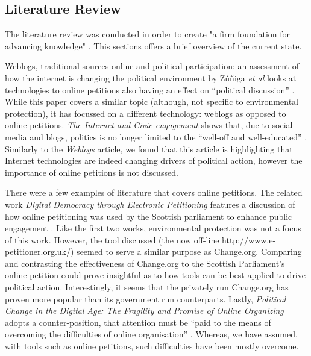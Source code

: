 
\subsection{Literature Review}
\label{subsec:literaturereview}
The literature review was conducted in order to create "a firm foundation for advancing knowledge" \citep[p. xiii]{webster2002analyzing}. This sections offers a brief overview of the current state.\par\vspace{0.2cm}

{Weblogs, traditional sources online and political participation: an assessment of how the internet is changing the political environment} by Zúñiga \textit{et al} looks at technologies to online petitions also having an effect on ``political discussion'' \citep{de2009weblogs}. While this paper covers a similar topic (although, not specific to environmental protection), it has focussed on a different technology: weblogs as opposed to online petitions. \textit{The Internet and Civic engagement} shows that, due to social media and blogs, politics is no longer limited to the ``well-off and well-educated'' \citep{smith2009internet}. Similarly to the \textit{Weblogs} article, we found that this article is highlighting that Internet technologies are indeed changing drivers of political action, however the importance of online petitions is not discussed.\par\vspace{0.2cm}

There were a few examples of literature that covers online petitions. The related work \textit{Digital Democracy through Electronic Petitioning} features a discussion of how online petitioning was used by the Scottish parliament to enhance public engagement \citep{macintosh2002digital}. Like the first two works, environmental protection was not a focus of this work. However, the tool discussed (the now off-line http://www.e-petitioner.org.uk/) seemed to serve a similar purpose as Change.org. Comparing and contrasting the effectiveness of Change.org to the Scottish Parliament's online petition could prove insightful as to how tools can be best applied to drive political action. Interestingly, it seems that the privately run Change.org has proven more popular than its government run counterparts. Lastly, \textit{Political Change in the Digital Age: The Fragility and Promise of Online Organizing} adopts a counter-position, that attention must be ``paid to the means of overcoming the difficulties of online organisation'' \citep{etling2010political}. Whereas, we have assumed, with tools such as online petitions, such difficulties have been mostly overcome.\par\vspace{0.2cm}


